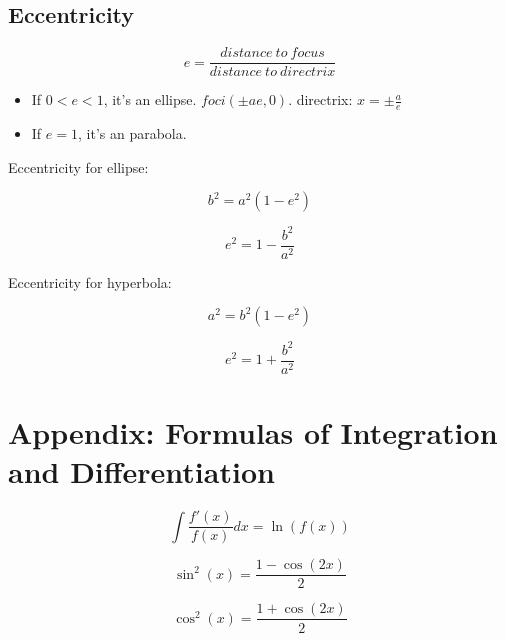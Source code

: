 \documentclass[a4paper,9pt]{scrartcl}
\begin{document}
    \subsection{Eccentricity}

    \begin{displaymath}
        e = \frac{distance\ to\ focus}{distance\ to\ directrix}
    \end{displaymath}

    \begin{itemize}
        \item If $0 < e < 1$, it's an ellipse.
        $foci({\pm}ae, 0)$.
        directrix: $x = \pm\frac{a}{e}$
        \item If $e = 1$, it's an parabola.
    \end{itemize}

    Eccentricity for ellipse:

    \begin{displaymath}
        b^2 = a^2(1-e^2)
    \end{displaymath}

    \begin{displaymath}
        e^2 = 1 - \frac{b^2}{a^2}
    \end{displaymath}

    Eccentricity for hyperbola:

    \begin{displaymath}
        a^2 = b^2(1-e^2)
    \end{displaymath}

    \begin{displaymath}
        e^2 = 1 + \frac{b^2}{a^2}
    \end{displaymath}


    \section{Appendix: Formulas of Integration and Differentiation}

    \begin{displaymath}
        \int \frac{f'(x)}{f(x)} dx = \ln(f(x))
    \end{displaymath}

    \begin{displaymath}
        \sin^2(x) = \frac{1-\cos(2x)}{2}
    \end{displaymath}

    \begin{displaymath}
        \cos^2(x) = \frac{1+\cos(2x)}{2}
    \end{displaymath}
\end{document}
